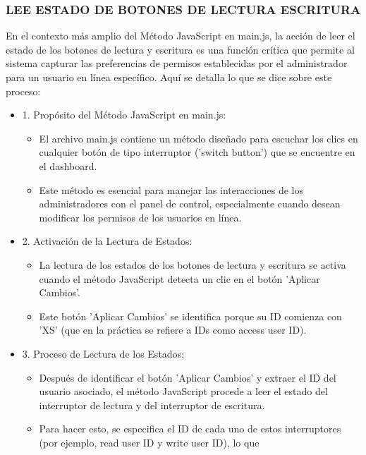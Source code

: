 \documentclass{report}
\begin{document}
\subsubsection{LEE ESTADO DE BOTONES DE LECTURA ESCRITURA}
En el contexto más amplio del Método JavaScript en main.js, la acción de leer el estado de los botones de lectura y escritura es una 
función crítica que permite al sistema capturar las preferencias de permisos establecidas por el administrador para un usuario en línea específico.
Aquí se detalla lo que se dice sobre este proceso:
\begin{itemize}
    \item 1. Propósito del Método JavaScript en main.js:
        \begin{itemize}
            \item El archivo main.js contiene un método diseñado para escuchar los clics en cualquier botón de tipo interruptor 
            ('switch button') que se encuentre en el dashboard.
            \item Este método es esencial para manejar las interacciones de los administradores con el panel de control, especialmente 
            cuando desean modificar los permisos de los usuarios en línea.
        \end{itemize}
    \item 2. Activación de la Lectura de Estados:
        \begin{itemize}
            \item La lectura de los estados de los botones de lectura y escritura se activa cuando el método JavaScript detecta un clic 
            en el botón 'Aplicar Cambios'.
            \item Este botón 'Aplicar Cambios' se identifica porque su ID comienza con 'XS' (que en la práctica se refiere a IDs como 
            access user ID).
        \end{itemize}
    \item 3. Proceso de Lectura de los Estados:
        \begin{itemize}
            \item Después de identificar el botón 'Aplicar Cambios' y extraer el ID del usuario asociado, el método JavaScript procede a leer 
            el estado del interruptor de lectura y del interruptor de escritura.
            \item Para hacer esto, se especifica el ID de cada uno de estos interruptores (por ejemplo, read user ID y write user ID), lo que 

\end{itemize}
\end{itemize}
\end{document}
